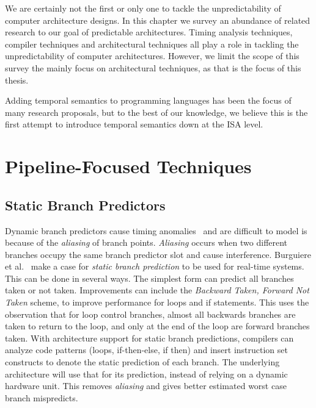 \label{sec:related_arch_mod}
We are certainly not the first or only one to tackle the unpredictability of computer architecture designs.
In this chapter we survey an abundance of related research to our goal of predictable architectures.
Timing analysis techniques, compiler techniques and architectural techniques all play a role in tackling the unpredictability of computer architectures.
However, we limit the scope of this survey the mainly focus on architectural techniques, as that is the focus of this thesis. 

Adding temporal semantics to programming languages has been the focus of many research proposals, but to the best of our knowledge, we believe this is the first attempt to introduce temporal semantics down at the ISA level. 


\section{Pipeline-Focused Techniques}
\subsection{Static Branch Predictors}
\label{sec:RTBranch}
Dynamic branch predictors cause timing anomalies~\cite{Engblom2003dynbranch} and are difficult to model is because of the \textit{aliasing} of branch points.   
\textit{Aliasing} occurs when two different branches occupy the same branch predictor slot and cause interference.
Burguiere et al.~\cite{Burguiere2005staticbranchpredict} make a case for \textit{static branch prediction} to be used for real-time systems.
This can be done in several ways. 
The simplest form can predict all branches taken or not taken. 
Improvements can include the \textit{Backward Taken, Forward Not Taken} scheme, to improve performance for loops and if statements.
This uses the observation that for loop control branches, almost all backwards branches are taken to return to the loop, and only at the end of the loop are forward branches taken. 
With architecture support for static branch predictions, compilers can analyze code patterns (loops, if-then-else, if then) and insert instruction set constructs to denote the static prediction of each branch.  
The underlying architecture will use that for its prediction, instead of relying on a dynamic hardware unit.
This removes \textit{aliasing} and gives better estimated worst case branch mispredicts. 

